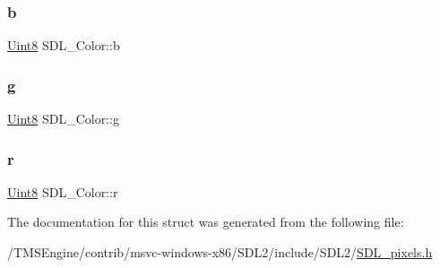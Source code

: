 \subsubsection{\texorpdfstring{b}{b}}
{\footnotesize\ttfamily \hyperlink{_s_d_l__stdinc_8h_a2944638813a090aa23e62f4da842c3e2}{Uint8} S\+D\+L\+\_\+\+Color\+::b}

\mbox{\label{struct_s_d_l___color_ae29d881bf740cfa7078b36e07f85d298}} 
\subsubsection{\texorpdfstring{g}{g}}
{\footnotesize\ttfamily \hyperlink{_s_d_l__stdinc_8h_a2944638813a090aa23e62f4da842c3e2}{Uint8} S\+D\+L\+\_\+\+Color\+::g}

\mbox{\label{struct_s_d_l___color_a0bb975b6829524133fdd3c6060cfa63d}} 
\subsubsection{\texorpdfstring{r}{r}}
{\footnotesize\ttfamily \hyperlink{_s_d_l__stdinc_8h_a2944638813a090aa23e62f4da842c3e2}{Uint8} S\+D\+L\+\_\+\+Color\+::r}



The documentation for this struct was generated from the following file\+:\begin{DoxyCompactItemize}
\item 
/\+T\+M\+S\+Engine/contrib/msvc-\/windows-\/x86/\+S\+D\+L2/include/\+S\+D\+L2/\hyperlink{_s_d_l__pixels_8h}{S\+D\+L\+\_\+pixels.\+h}\end{DoxyCompactItemize}
